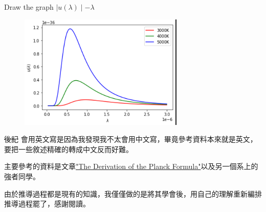 \documentclass[12pt, a4paper]{article}
\begin{document}
\begin{CJK*}{UTF8}{bsmi}
Draw the graph \(\mid u(\lambda)\mid -\lambda\)
\begin{figure}[H]
    \begin{center}
        \includegraphics[width=0.7\textwidth]{"Screenshot 2022-06-13 120427.png"}
    \end{center}
\end{figure}
\st{後記}
會用英文寫是因為我發現我不太會用中文寫，畢竟參考資料本來就是英文，要把一些敘述精確的轉成中文反而好難。

主要參考的資料是文章\href{https://edisciplinas.usp.br/pluginfile.php/48089/course/section/16461/qsp_chapter10-plank.pdf}{"The Derivation of the Planck Formula"}以及另一個系上的強者同學。

由於推導過程都是現有的知識，我僅僅做的是將其學會後，用自己的理解重新編排推導過程罷了，感謝閱讀。
\end{CJK*}
\end{document}
